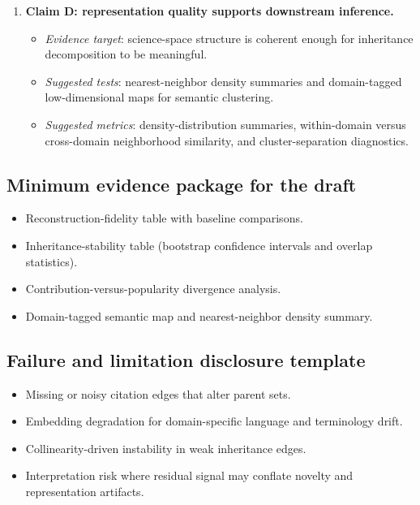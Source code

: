 \begin{enumerate}
    \item \textbf{Claim D: representation quality supports downstream inference.}
    \begin{itemize}
        \item \emph{Evidence target}: science-space structure is coherent enough for inheritance decomposition to be meaningful.
        \item \emph{Suggested tests}: nearest-neighbor density summaries and domain-tagged low-dimensional maps for semantic clustering.
        \item \emph{Suggested metrics}: density-distribution summaries, within-domain versus cross-domain neighborhood similarity, and cluster-separation diagnostics.
    \end{itemize}
\end{enumerate}

\subsection{Minimum evidence package for the draft}
\begin{itemize}
    \item Reconstruction-fidelity table with baseline comparisons.
    \item Inheritance-stability table (bootstrap confidence intervals and overlap statistics).
    \item Contribution-versus-popularity divergence analysis.
    \item Domain-tagged semantic map and nearest-neighbor density summary.
\end{itemize}

\subsection{Failure and limitation disclosure template}
\begin{itemize}
    \item Missing or noisy citation edges that alter parent sets.
    \item Embedding degradation for domain-specific language and terminology drift.
    \item Collinearity-driven instability in weak inheritance edges.
    \item Interpretation risk where residual signal may conflate novelty and representation artifacts.
\end{itemize}


